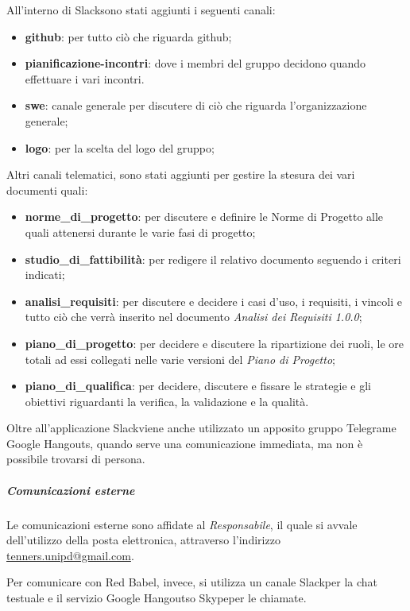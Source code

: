    					All'interno di Slack\glo sono stati aggiunti i seguenti canali:
   					\begin{itemize}
   						\item \textbf{github}: per tutto ciò che riguarda github;
   						\item \textbf{pianificazione-incontri}: dove i membri del gruppo decidono quando effettuare i vari incontri.
   						\item \textbf{swe}: canale generale per discutere di ciò che riguarda l'organizzazione generale;
   						\item \textbf{logo}: per la scelta del logo del gruppo;
   						
   					\end{itemize}
   					Altri canali telematici, sono stati aggiunti per gestire la stesura dei vari documenti quali:
   					\begin{itemize}
   						\item \textbf{norme\_di\_progetto}: per discutere e definire le Norme di Progetto alle quali attenersi durante le varie fasi di progetto;
   						\item \textbf{studio\_di\_fattibilità}: per redigere il relativo documento seguendo i criteri indicati;
   						\item \textbf{analisi\_requisiti}: per discutere e decidere i casi d'uso, i requisiti, i vincoli e tutto ciò che verrà inserito nel documento \textit{Analisi dei Requisiti 1.0.0};
   						\item \textbf{piano\_di\_progetto}: per decidere e discutere la ripartizione dei ruoli, le ore totali ad essi collegati nelle varie versioni del \textit{Piano di Progetto};
   						\item \textbf{piano\_di\_qualifica}: per decidere, discutere e fissare le strategie e gli obiettivi riguardanti la verifica, la validazione e la qualità.
   					\end{itemize}
   					Oltre all'applicazione Slack\glo viene anche utilizzato un apposito gruppo Telegram\glos e Google Hangouts\glos, quando serve una comunicazione immediata, ma non è possibile trovarsi di persona.
   				\subparagraph{Comunicazioni esterne}
   					Le comunicazioni esterne sono affidate al \textit{Responsabile}, il quale si avvale dell'utilizzo della posta elettronica, attraverso l'indirizzo \href{mailto:tenners.unipd@gmail.com}{tenners.unipd@gmail.com}.
   					
   					Per comunicare con Red Babel, invece, si utilizza un canale Slack\glo per la chat testuale e il servizio Google Hangouts\glos o Skype\glo per le chiamate.
   					
